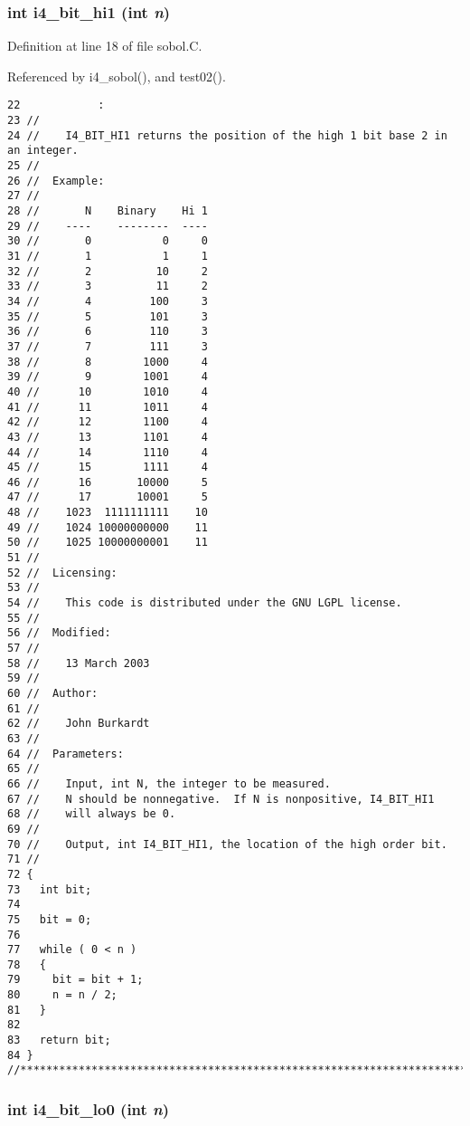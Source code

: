 \subsubsection{\setlength{\rightskip}{0pt plus 5cm}int i4\_\-bit\_\-hi1 (int {\em n})}\label{sobol_8C_6fb065d7955723a90f53c5d4cc0f160d}




Definition at line 18 of file sobol.C.

Referenced by i4\_\-sobol(), and test02().

\begin{Code}\begin{verbatim}22            :
23 //
24 //    I4_BIT_HI1 returns the position of the high 1 bit base 2 in an integer.
25 //
26 //  Example:
27 //
28 //       N    Binary    Hi 1
29 //    ----    --------  ----
30 //       0           0     0
31 //       1           1     1
32 //       2          10     2
33 //       3          11     2 
34 //       4         100     3
35 //       5         101     3
36 //       6         110     3
37 //       7         111     3
38 //       8        1000     4
39 //       9        1001     4
40 //      10        1010     4
41 //      11        1011     4
42 //      12        1100     4
43 //      13        1101     4
44 //      14        1110     4
45 //      15        1111     4
46 //      16       10000     5
47 //      17       10001     5
48 //    1023  1111111111    10
49 //    1024 10000000000    11
50 //    1025 10000000001    11
51 //
52 //  Licensing:
53 //
54 //    This code is distributed under the GNU LGPL license. 
55 //
56 //  Modified:
57 //
58 //    13 March 2003
59 //
60 //  Author:
61 //
62 //    John Burkardt
63 //
64 //  Parameters:
65 //
66 //    Input, int N, the integer to be measured.
67 //    N should be nonnegative.  If N is nonpositive, I4_BIT_HI1
68 //    will always be 0.
69 //
70 //    Output, int I4_BIT_HI1, the location of the high order bit.
71 //
72 {
73   int bit;
74 
75   bit = 0;
76 
77   while ( 0 < n )
78   {
79     bit = bit + 1;
80     n = n / 2;
81   }
82 
83   return bit;
84 }
//****************************************************************************80
\end{verbatim}
\end{Code}


\subsubsection{\setlength{\rightskip}{0pt plus 5cm}int i4\_\-bit\_\-lo0 (int {\em n})}\label{sobol_8C_2f2ea13fe07e02ffc849fcd0c57c8220}




